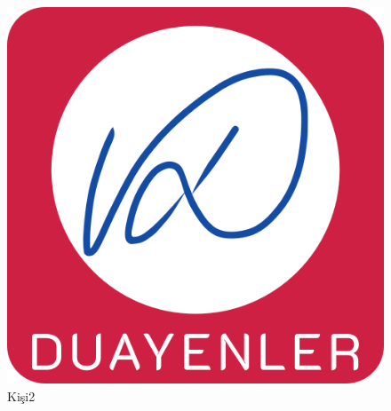 \begin{minipage}{0.8\textwidth}
\begin{flushleft} 

\blindtext


\end{flushleft}
\end{minipage}
\begin{minipage}{0.28\textwidth}
\begin{flushright} 

\begin{figure}[H]
\center
\setlength{\unitlength}{\textwidth} 
\includegraphics[width=0.7\unitlength]{images/logo1}
\caption{\label{fig:kisi2}Kişi2 }
\end{figure}

\end{flushright}
\end{minipage}\\[0.8cm]


